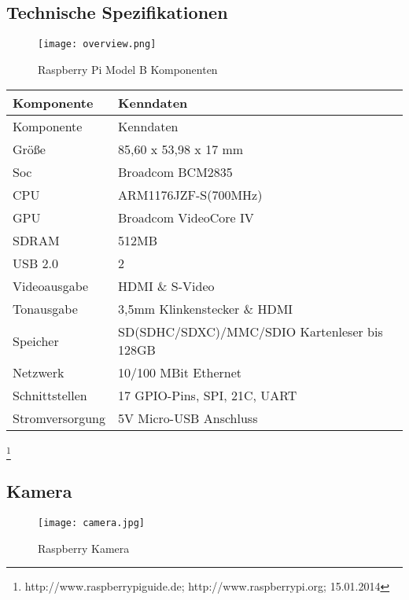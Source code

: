 \subsection{Technische Spezifikationen}

\begin{figure}[h]
  \begin{center}		%
    \texttt{[image: overview.png]}
  		  \caption{Raspberry Pi Model B Komponenten}
     \label{raspPic_Komp}
  \end{center}
\end{figure}

\begin{longtable}{||l|l||}

\hline
Komponente & Kenndaten\\ \hline\hline
\endfirsthead
\hline
Komponente & Kenndaten \\ \hline\hline
\endhead

Größe & 85,60 x 53,98 x 17 mm\\ \hline
Soc & Broadcom BCM2835\\ \hline
CPU & ARM1176JZF-S(700MHz)\\ \hline
GPU & Broadcom VideoCore IV \\ \hline
SDRAM & 512MB\\ \hline
USB 2.0 & 2\\ \hline
Videoausgabe & HDMI \& S-Video\\ \hline
Tonausgabe & 3,5mm Klinkenstecker \& HDMI\\ \hline
Speicher & SD(SDHC/SDXC)/MMC/SDIO Kartenleser bis 128GB\\ \hline
Netzwerk & 10/100 MBit Ethernet\\ \hline
Schnittstellen & 17 GPIO-Pins, SPI, 21C, UART\\ \hline
Stromversorgung & 5V Micro-USB Anschluss\\ \hline

\end{longtable}
\footnote{http://www.raspberrypiguide.de; http://www.raspberrypi.org; 15.01.2014}


\newpage

\subsection{Kamera}

\begin{figure}[h]
  \begin{center}		%
    \texttt{[image: camera.jpg]}
  		  \caption{Raspberry Kamera}
     \label{raspCam}
  \end{center}
\end{figure}


